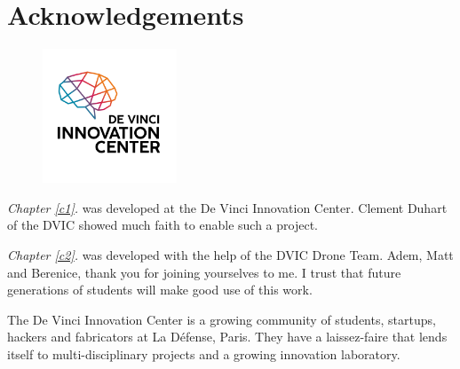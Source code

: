 \section{Acknowledgements}





\begin{figure}[!h]
      \includegraphics[width=4cm, left]{images/dvic.png}
\end{figure}

\textit{Chapter \ref{c1}. } was developed at the De Vinci Innovation Center. Clement Duhart of the DVIC showed much faith to enable such a project.

\textit{Chapter \ref{c2}. } was developed with the help of the DVIC Drone Team. Adem, Matt and Berenice, thank you for joining yourselves to me. I trust that future generations of students will make good use of this work. 

The De Vinci Innovation Center is a growing community of students, startups, hackers and fabricators at La Défense, Paris. They have a laissez-faire that lends itself to multi-disciplinary projects and a growing innovation laboratory.                             


